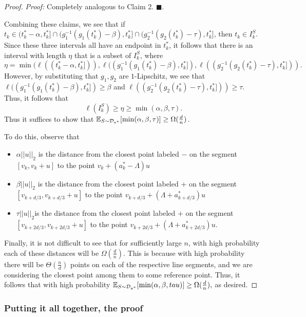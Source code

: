 \begin{proof}
\textit{Proof: }  Completely analogous to Claim 2. $\blacksquare$.

Combining these claims, we see that if $t_k \in (t_k^* - \alpha, t_k^*] \cap (g_1^{-1}(g_1(t_k^*) - \beta), t_k^*] \cap  (g_2^{-1}(g_2(t_k^*) - \tau), t_k^*]$, then $t_k \in I_k^S$. Since these three intervals all have an endpoint in $t_k^*$, it follows that there is an interval with length $\eta$ that is a subset of $I_k^S$, where $$\eta = \min(\ell((t_k^* - \alpha, t_k^*])), \ell((g_1^{-1}(g_1(t_k^*) - \beta), t_k^*]), \ell((g_2^{-1}(g_2(t_k^*) - \tau), t_k^*])).$$ However, by substituting that $g_1, g_2$ are $1$-Lipschitz, we see that $\ell((g_1^{-1}(g_1(t_k^*) - \beta), t_k^*]) \geq \beta$ and $\ell((g_2^{-1}(g_2(t_k^*) - \tau), t_k^*])) \geq \tau$. Thus, it follows that $$\ell(I_k^S) \geq \eta \geq \min(\alpha, \beta, \tau).$$ Thus it suffices to show that ${\mathbb E}_{S \sim {\mathcal D}_{a^*}}[\min(\alpha, \beta, \tau)] \geq \Omega(\frac{d}{n})$. 

To do this, observe that
\begin{itemize}
	\item $\alpha||u||_2$ is the distance from the closest point labeled $-$ on the segment $[v_k, v_k + u]$ to the point $v_k + (a_k^* - \Lambda)u$
	\item  $\beta||u||_2$ is the distance from the closest point labeled $+$ on the segment $[v_{k+d/3}, v_{k+d/3} + u]$ to the point $v_{k+d/3} + (\Lambda + a_{k+d/3}^*)u$
	\item $\tau||u||_2$is the distance from the closest point labeled $+$ on the segment $[v_{k + 2d/3}, v_{k + 2d/3} + u]$ to the point $v_{k+2d/3} + (\Lambda + a_{k+2d/3}^*)u$.
\end{itemize}

Finally, it is not difficult to see that for sufficiently large $n$, with high probability each of these distances will be $\Omega(\frac{d}{n})$. This is because with high probability there will be $\Theta(\frac{n}{d})$ points on each of the respective line segments, and we are considering the closest point among them to some reference point. Thus, it follows that with high probability ${\mathbb E}_{S \sim {\mathcal D}_{a^*}}[\min(\alpha, \beta, tau)] \geq \Omega(\frac{d}{n}),$ as desired.
\end{proof}

\subsubsection{Putting it all together, the proof}\label{subsubsec:proof}

